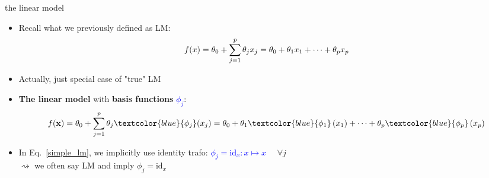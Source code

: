 \documentclass[11pt,compress,t,notes=noshow, xcolor=table]{beamer}
\begin{document}
\begin{vbframe}{the linear model}

\begin{itemize}
    \item Recall what we previously defined as LM:
    \begin{equation} \label{simple_lm}
      f(x) = \theta_0 + \sum\limits_{j=1}^p \theta_j x_j =
      \theta_0 + \theta_1 x_1 + \dots + \theta_p x_p
    \end{equation}
    \item Actually, just special case of "true" LM
    \item \textbf{The linear model} with \textbf{basis functions}
    \textcolor{blue}{$\phi_j$}:
    \begin{equation*} \label{true_lm}
      \fx = \theta_0 + \sumjp \theta_j \textcolor{blue}{\phi_j} (x_j)
      = \theta_0 + \theta_1  \textcolor{blue}{\phi_1} \left( x_1 \right)
      + \dots + \theta_p \textcolor{blue}{\phi_p} \left(x_p \right)
    \end{equation*}
    \item In Eq.~\ref{simple_lm}, we implicitly use identity trafo:
    \textcolor{blue}{$\phi_j = \text{id}_x: x \mapsto x$}~~ $\forall j$ \\
    $\rightsquigarrow$ we often say LM and imply
    $\phi_j = \text{id}_x$
\end{itemize}

\end{vbframe}

\end{document}

